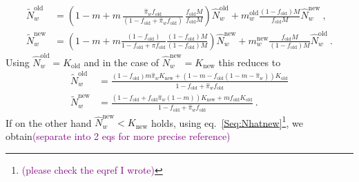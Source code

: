 \documentclass[11pt]{article}
\newcommand{\florence}[1]{\textcolor{purple}{(#1)}} %
\begin{document}
\begin{equation}
\begin{aligned}
\widetilde{N}_w^{\text{old}} &= \left(1-m + m\, \frac{\widehat{\pi}_w f_{\text{old}}}{(1-f_{\text{old}}+\widehat{\pi}_w f_{\text{old}})}\,  \frac{f_{\text{old}}M}{f_{\text{old}}M} \right) \widehat{N}_w^{\text{old}} + m_w^{\text{old}} \frac{(1-f_{\text{old}})M}{f_{\text{old}}M}\widehat{N}_w^{\text{new}}\ , \\
\widetilde{N}_w^{\text{new}} &= \left(1-m + m\frac{(1-f_{\text{old}})}{1-f_{\text{old}}+\pi f_{\text{old}}} \frac{(1-f_{\text{old}})M}{(1-f_{\text{old}})M}\right)\widehat{N}_w^{\text{new}} + m_w^{\text{new}} \frac{f_{\text{old}} M}{(1-f_{\text{old}})M} \widehat{N}_w^{\text{old}}\ .
\end{aligned}
\end{equation}
Using $\widehat{N}_w^{\text{old}}=K_{\text{old}}$ and in the case of $\widehat{N}_w^{\text{new}} = K_{\text{new}}$ this reduces to
\begin{equation}\label{Seq:wt_eq1}
\begin{aligned}
\widetilde{N}_w^{\text{old}} &= \frac{(1-f_{\text{old}})m\widehat{\pi}_w K_{\text{new}} + (1-m-f_{\text{old}}(1-m-\widehat{\pi}_w))K_{\text{old}}}{1-f_{\text{old}}+\widehat{\pi}_w f_{\text{old}}} \\ 
\widetilde{N}_w^{\text{new}}&= \frac{(1-f_{\text{old}}+f_{\text{old}}\widehat{\pi}_w (1-m))K_{\text{new}} + m f_{\text{old}} K_{\text{old}}}{1-f_{\text{old}}+\widehat{\pi}_w f_{\text{old}}}\ .
\end{aligned}
\end{equation}
%
If on the other hand $\widehat{N}_w^{\text{new}}<K_{\text{new}}$ holds, using eq.~\eqref{Seq:Nhatnew}\footnote{\florence{please check the eqref I wrote}}, we obtain\florence{separate into 2 eqs for more precise reference}
\end{document}
